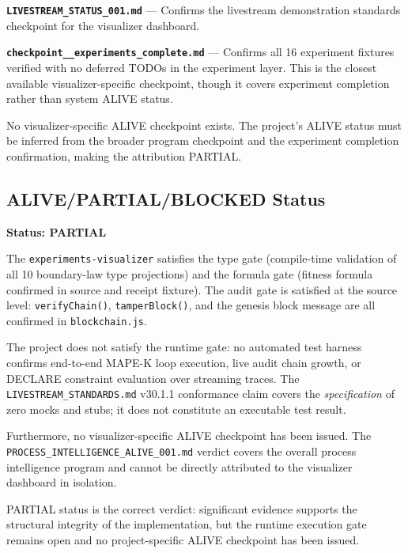 \textbf{\texttt{LIVESTREAM\_STATUS\_001.md}} — Confirms the livestream demonstration
standards checkpoint for the visualizer dashboard.

\textbf{\texttt{checkpoint\_\_experiments\_complete.md}} — Confirms all 16 experiment fixtures
verified with no deferred TODOs in the experiment layer. This is the closest available
visualizer-specific checkpoint, though it covers experiment completion rather than system
ALIVE status.

No visualizer-specific ALIVE checkpoint exists. The project's ALIVE status must be inferred
from the broader program checkpoint and the experiment completion confirmation, making the
attribution PARTIAL.

\subsection{ALIVE/PARTIAL/BLOCKED Status}
\label{sec:experiments-visualizer-evidence-status}

\textbf{Status: PARTIAL}

The \texttt{experiments-visualizer} satisfies the type gate (compile-time validation of all
10 boundary-law type projections) and the formula gate (fitness formula confirmed in source
and receipt fixture). The audit gate is satisfied at the source level: \texttt{verifyChain()},
\texttt{tamperBlock()}, and the genesis block message are all confirmed in \texttt{blockchain.js}.

The project does not satisfy the runtime gate: no automated test harness confirms end-to-end
MAPE-K loop execution, live audit chain growth, or DECLARE constraint evaluation over streaming
traces. The \texttt{LIVESTREAM\_STANDARDS.md} v30.1.1 conformance claim covers the
\emph{specification} of zero mocks and stubs; it does not constitute an executable test result.

Furthermore, no visualizer-specific ALIVE checkpoint has been issued. The
\texttt{PROCESS\_INTELLIGENCE\_ALIVE\_001.md} verdict covers the overall process intelligence
program and cannot be directly attributed to the visualizer dashboard in isolation.

PARTIAL status is the correct verdict: significant evidence supports the structural integrity
of the implementation, but the runtime execution gate remains open and no project-specific
ALIVE checkpoint has been issued.

